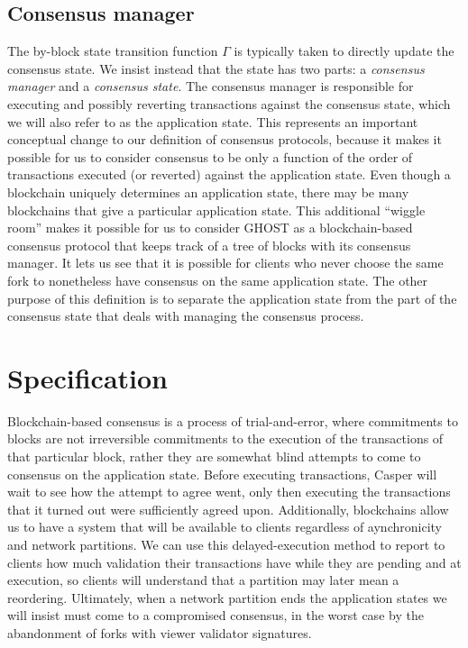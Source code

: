 \documentclass[11pt,a4paper]{article}
\begin{document}
\subsection{Consensus manager}

The by-block state transition function $\Gamma$ is typically taken to directly update the consensus state. We insist instead that the state has two parts: a \emph{consensus manager} and a \emph{consensus state}. The consensus manager is responsible for executing and possibly reverting transactions against the consensus state, which we will also refer to as the application state. This represents an important conceptual change to our definition of consensus protocols, because it makes it possible for us to consider consensus to be only a function of the order of transactions executed (or reverted) against the application state. Even though a blockchain uniquely determines an application state, there may be many blockchains that give a particular application state. This additional ``wiggle room'' makes it possible for us to consider GHOST as a blockchain-based consensus protocol that keeps track of a tree of blocks with its consensus manager. It lets us see that it is possible for clients who never choose the same fork to nonetheless have consensus on the same application state. The other purpose of this definition is to separate the application state from the part of the consensus state that deals with managing the consensus process.

\section{Specification}

Blockchain-based consensus is a process of trial-and-error, where commitments to blocks are not irreversible commitments to the execution of the transactions of that particular block, rather they are somewhat blind attempts to come to consensus on the application state. Before executing transactions, Casper will wait to see how the attempt to agree went, only then executing the transactions that it turned out were sufficiently agreed upon. Additionally, blockchains allow us to have a system that will be available to clients regardless of aynchronicity and network partitions. We can use this delayed-execution method to report to clients how much validation their transactions have while they are pending and at execution, so clients will understand that a partition may later mean a reordering. Ultimately, when a network partition ends the application states we will insist must come to a compromised consensus, in the worst case by the abandonment of forks with viewer validator signatures. 
\end{document}
